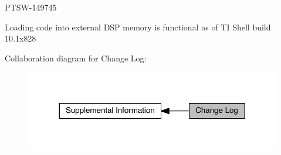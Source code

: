 \begin{DoxyItemize}
\item P\+T\+S\+W-\/149745 
\begin{DoxyItemize}
\item Loading code into external D\+S\+P memory is functional as of T\+I Shell build 10.\+1x828 
\end{DoxyItemize}
\end{DoxyItemize}Collaboration diagram for Change Log\+:
\nopagebreak
\begin{figure}[H]
\begin{center}
\leavevmode
\includegraphics[width=317pt]{a00375}
\end{center}
\end{figure}
